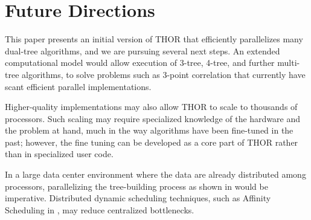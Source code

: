 \documentclass[twoside,leqno,twocolumn]{article}
\newcommand{\authornote}[1]{(\footnote{Note to self: #1})}
\newcommand{\authorsnote}[1]{\authornote{#1}}
\newcommand{\fig}[1]{Figure~\ref{fig:#1}}
\begin{document}




\section{Future Directions}

This paper presents an initial version of THOR that efficiently parallelizes many dual-tree algorithms, and we are pursuing several next steps.
An extended computational model would allow execution of 3-tree, 4-tree, and further multi-tree algorithms, to solve problems such as 3-point correlation that currently have scant efficient parallel implementations.

Higher-quality implementations may also allow THOR to scale to thousands of processors.
Such scaling may require specialized knowledge of the hardware and the problem at hand, much in the way algorithms have been fine-tuned in the past; however, the fine tuning can be developed as a core part of THOR rather than in specialized user code.

In a large data center environment where the data are already distributed among processors, parallelizing the tree-building process as shown in \cite{alfuraih00parallel} would be imperative.
Distributed dynamic scheduling techniques, such as Affinity Scheduling in \cite{markatos92using}, may reduce centralized bottlenecks.
\end{document}
